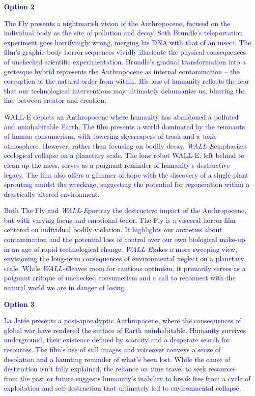 \documentclass[11pt,fleqn]{book}
\begin{document}
\begin{exercise}
\textcolor{blue}{
\textbf{Option 2}
}

\textcolor{blue}{
The Fly presents a nightmarish vision of the Anthropocene, focused on the individual body as the site of pollution and decay. Seth Brundle's teleportation experiment goes horrifyingly wrong, merging his DNA with that of an insect. The film's graphic body horror sequences vividly illustrate the physical consequences of unchecked scientific experimentation. Brundle's gradual transformation into  a grotesque hybrid represents the Anthropocene as internal contamination – the corruption of the natural order from within. His loss of humanity reflects the fear that our technological interventions may ultimately dehumanize us, blurring the line between creator and creation.
}

\textcolor{blue}{
WALL-E depicts an Anthropocene where humanity has abandoned a polluted and uninhabitable Earth. The film presents a world dominated by the remnants of human consumerism, with towering skyscrapers of trash and a toxic atmosphere. However, rather than focusing on bodily decay, \textit{WALL-E}emphasizes ecological collapse on a planetary scale. The lone robot WALL-E, left behind to clean up the mess, serves as a poignant reminder of humanity's destructive legacy. The film also offers a glimmer of hope with the discovery of a single plant sprouting amidst the wreckage, suggesting the potential for regeneration within a drastically altered environment.
}

\textcolor{blue}{
Both The Fly and \textit{WALL-E}portray the destructive impact of the Anthropocene, but with varying focus and emotional tenor. The Fly is a visceral horror film centered on individual bodily violation. It highlights our anxieties about contamination and the potential loss of control over our own biological make-up in an age of rapid technological change. \textit{WALL-E}takes a more sweeping view, envisioning the long-term consequences of environmental neglect on a planetary scale. While \textit{WALL-E}leaves room for cautious optimism, it primarily serves as a poignant critique of unchecked consumerism and a call to reconnect with the natural world we are in danger of losing.
}

\textcolor{blue}{
\textbf{Option 3}
}

\textcolor{blue}{
La Jetée presents a post-apocalyptic Anthropocene, where the consequences of global war have rendered the surface of Earth uninhabitable. Humanity survives underground, their existence defined by scarcity and a desperate search for resources. The film's use of still images and voiceover conveys a sense of desolation and a haunting reminder of what's been lost. While the cause of destruction isn't fully explained, the reliance on time travel to seek resources from the past or future suggests humanity's inability to break free from a cycle of exploitation and self-destruction that ultimately led to environmental collapse.
}


\end{exercise}
\end{document}
